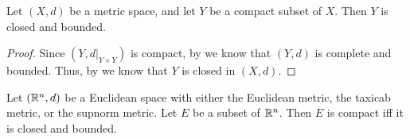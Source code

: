\begin{cor}\label{ii:1.5.6}
  Let \((X, d)\) be a metric space, and let \(Y\) be a compact subset of \(X\).
  Then \(Y\) is closed and bounded.
\end{cor}

\begin{proof}
  Since \((Y, d|_{Y \times Y})\) is compact, by  we know that \((Y, d)\) is complete and bounded.
  Thus, by  we know that \(Y\) is closed in \((X, d)\).
\end{proof}

\begin{thm}\label{ii:1.5.7}
  Let \((\mathbb{R}^n, d)\) be a Euclidean space with either the Euclidean metric, the taxicab metric, or the supnorm metric.
  Let \(E\) be a subset of \(\mathbb{R}^n\).
  Then \(E\) is compact iff it is closed and bounded.
\end{thm}

